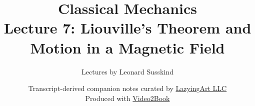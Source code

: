 \documentclass[11pt,oneside]{book}
\begin{document}
\hypersetup{pageanchor=false}
\frontmatter
\title{Classical Mechanics\\[0.45em]
\large Lecture 7: Liouville's Theorem and Motion in a Magnetic Field}
\author{Lectures by Leonard Susskind}
\date{Transcript-derived companion notes curated by
\href{https://lazying.art}{LazyingArt LLC}\\[0.35em]
\small Produced with
\href{https://github.com/lachlanchen/Video2Book}{Video2Book}}
\maketitle
\hypersetup{pageanchor=true}
\mainmatter

\end{document}
